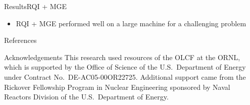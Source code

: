 \documentclass[final]{beamer}
\begin{document}
\begin{frame}{}
\begin{columns}[t]
\begin{column}{.3\linewidth}
\begin{block}{Results\textemdash RQI + MGE}
\vspace*{0.3 em}
          	\begin{itemize}
          	\item{RQI + MGE performed well on a large machine for a challenging problem}
          	\end{itemize}
		\end{block}
			\vfill
        	\begin{block}{\large References}
			\printbibliography
        	\end{block}
			\vfill
        	\begin{block}{\large Acknowledgements}
		\justifying
        \small{This research used resources of the OLCF at the ORNL, which is supported 
        by the Office of Science of the U.S.\ Department of Energy under Contract 
        No.\ DE-AC05-00OR22725. Additional support came from the Rickover Fellowship
        Program in Nuclear Engineering sponsored by Naval Reactors Division of the 
        U.S.\ Department of Energy.}
        	\end{block}
      \end{column}
    \end{columns}
  \end{frame}
\end{document}
